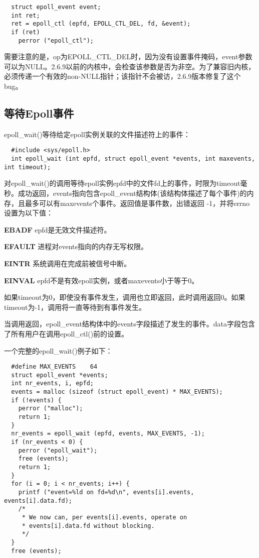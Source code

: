 \begin{lstlisting}
  struct epoll_event event;
  int ret;
  ret = epoll_ctl (epfd, EPOLL_CTL_DEL, fd, &event);
  if (ret)
    perror ("epoll_ctl");
\end{lstlisting}

需要注意的是，op为EPOLL\_CTL\_DEL时，因为没有设置事件掩码，event参数可以为NULL。2.6.9以前的内核中，会检查该参数是否为非空。为了兼容旧内核，必须传递一个有效的non-NULL指针；该指针不会被访，2.6.9版本修复了这个bug。
 
\subsection{等待Epoll事件}

epoll\_wait()等待给定epoll实例关联的文件描述符上的事件：

\begin{lstlisting}
  #include <sys/epoll.h>
  int epoll_wait (int epfd, struct epoll_event *events, int maxevents, int timeout);
\end{lstlisting}

对epoll\_wait()的调用等待epoll实例epfd中的文件fd上的事件，时限为timeout毫秒。成功返回，events指向包含epoll\_event结构体(该结构体描述了每个事件)的内存，且最多可以有maxevents个事件。返回值是事件数，出错返回 -1，并将errno设置为以下值：

\begin{eqlist*}
\item[\textbf{EBADF}] epfd是无效文件描述符。
\item[\textbf{EFAULT}] 进程对events指向的内存无写权限。
\item[\textbf{EINTR}] 系统调用在完成前被信号中断。
\item[\textbf{EINVAL}] epfd不是有效epoll实例，或者maxevents小于等于0。
\end{eqlist*}

如果timeout为0，即使没有事件发生，调用也立即返回，此时调用返回0。如果timeout为-1，调用将一直等待到有事件发生。

当调用返回，epoll\_event结构体中的events字段描述了发生的事件。data字段包含了所有用户在调用epoll\_ctl()前的设置。

一个完整的epoll\_wait()例子如下：

\begin{lstlisting}
  #define MAX_EVENTS    64
  struct epoll_event *events;
  int nr_events, i, epfd;
  events = malloc (sizeof (struct epoll_event) * MAX_EVENTS);
  if (!events) {
    perror ("malloc");
    return 1;
  }
  nr_events = epoll_wait (epfd, events, MAX_EVENTS, -1);
  if (nr_events < 0) {
    perror ("epoll_wait");
    free (events);
    return 1;
  }
  for (i = 0; i < nr_events; i++) {
    printf ("event=%ld on fd=%d\n", events[i].events, events[i].data.fd);
    /*
     * We now can, per events[i].events, operate on
     * events[i].data.fd without blocking.
     */
  }
  free (events);   
\end{lstlisting}

